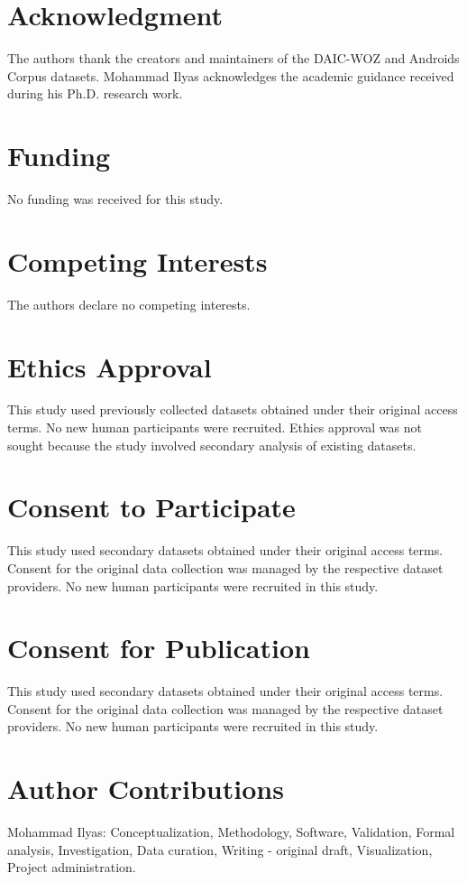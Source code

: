 \section*{Acknowledgment}
The authors thank the creators and maintainers of the DAIC-WOZ and Androids Corpus datasets. Mohammad Ilyas acknowledges the academic guidance received during his Ph.D. research work.

\section*{Funding}
No funding was received for this study.

\section*{Competing Interests}
The authors declare no competing interests.

\section*{Ethics Approval}
This study used previously collected datasets obtained under their original access terms. No new human participants were recruited. Ethics approval was not sought because the study involved secondary analysis of existing datasets.

\section*{Consent to Participate}
This study used secondary datasets obtained under their original access terms. Consent for the original data collection was managed by the respective dataset providers. No new human participants were recruited in this study.

\section*{Consent for Publication}
This study used secondary datasets obtained under their original access terms. Consent for the original data collection was managed by the respective dataset providers. No new human participants were recruited in this study.

\section*{Author Contributions}
Mohammad Ilyas: Conceptualization, Methodology, Software, Validation, Formal analysis, Investigation, Data curation, Writing - original draft, Visualization, Project administration.

